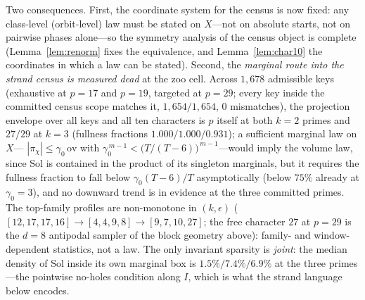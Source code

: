 \documentclass[11pt,a4paper]{article}
\numberwithin{equation}{section}
\theoremstyle{plain}
\theoremstyle{definition}
\theoremstyle{remark}
\begin{document}
Two consequences. First, the coordinate system for the census is now
fixed: any class-level (orbit-level) law must be stated on
$X$---not on absolute starts, not on pairwise phases alone---so the
symmetry analysis of the census object is complete
(Lemma~\ref{lem:renorm} fixes the equivalence, and
Lemma~\ref{lem:char10} the coordinates in which a law can be stated).
Second, the \emph{marginal route into the strand census is measured
dead} at the zoo cell. Across $1{,}678$ admissible keys (exhaustive at
$p=17$ and $p=19$, targeted at $p=29$; every key inside the committed
census scope matches it, $1{,}654/1{,}654$, $0$ mismatches), the
projection envelope over all keys and all ten characters is $p$ itself
at both $k=2$ primes and $27/29$ at $k=3$ (fullness fractions
$1.000/1.000/0.931$); a sufficient marginal law on $X$---
$|\pi_\chi|\le\gamma_0\,\mathrm{ov}$ with
$\gamma_0^{\,m-1}<\bigl(T/(T-6)\bigr)^{\,m-1}$---would imply the
volume law, since $\mathrm{Sol}$ is contained in the product of its
singleton marginals, but it requires the fullness fraction to fall
below $\gamma_0(T-6)/T$ asymptotically (below $75\%$ already at
$\gamma_0=3$), and no downward trend is in evidence at the three
committed primes. The top-family profiles are non-monotone in
$(k,\epsilon)$ ($[12,17,17,16]\to[4,4,9,8]\to[9,7,10,27]$; the free
character $27$ at $p=29$ is the $d=8$ antipodal sampler of the block
geometry above): family- and window-dependent statistics, not a law.
The only invariant sparsity is \emph{joint}: the median density of
$\mathrm{Sol}$ inside its own marginal box is $1.5\%/7.4\%/6.9\%$ at
the three primes---the pointwise no-holes condition along $I$, which
is what the strand language below encodes.
\end{document}
